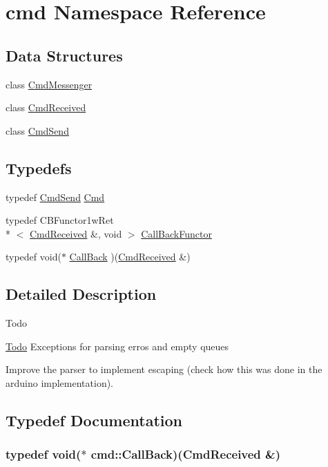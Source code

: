 \hypertarget{namespacecmd}{\section{cmd Namespace Reference}
\label{namespacecmd}
}
\subsection*{Data Structures}
\begin{DoxyCompactItemize}
\item 
class \hyperlink{classcmd_1_1_cmd_messenger}{Cmd\+Messenger}
\item 
class \hyperlink{classcmd_1_1_cmd_received}{Cmd\+Received}
\item 
class \hyperlink{classcmd_1_1_cmd_send}{Cmd\+Send}
\end{DoxyCompactItemize}
\subsection*{Typedefs}
\begin{DoxyCompactItemize}
\item 
typedef \hyperlink{classcmd_1_1_cmd_send}{Cmd\+Send} \hyperlink{namespacecmd_af9b58ca395c80edd1335e21d1b9f4c99}{Cmd}
\item 
typedef C\+B\+Functor1w\+Ret\\*
$<$ \hyperlink{classcmd_1_1_cmd_received}{Cmd\+Received} \&, void $>$ \hyperlink{namespacecmd_a24926dd0c7587e1961fd9ebe0259beea}{Call\+Back\+Functor}
\item 
typedef void($\ast$ \hyperlink{namespacecmd_a20b40ecd3ba46130eef6c125f70c4121}{Call\+Back} )(\hyperlink{classcmd_1_1_cmd_received}{Cmd\+Received} \&)
\end{DoxyCompactItemize}


\subsection{Detailed Description}
\begin{DoxyRefDesc}{Todo}
\item[\hyperlink{todo__todo000002}{Todo}]Exceptions for parsing erros and empty queues 

Improve the parser to implement escaping (check how this was done in the arduino implementation). \end{DoxyRefDesc}


\subsection{Typedef Documentation}
\hypertarget{namespacecmd_a20b40ecd3ba46130eef6c125f70c4121}{
\subsubsection[{Call\+Back}]{\setlength{\rightskip}{0pt plus 5cm}typedef void($\ast$ cmd\+::\+Call\+Back)({\bf Cmd\+Received} \&)}}\label{namespacecmd_a20b40ecd3ba46130eef6c125f70c4121}


